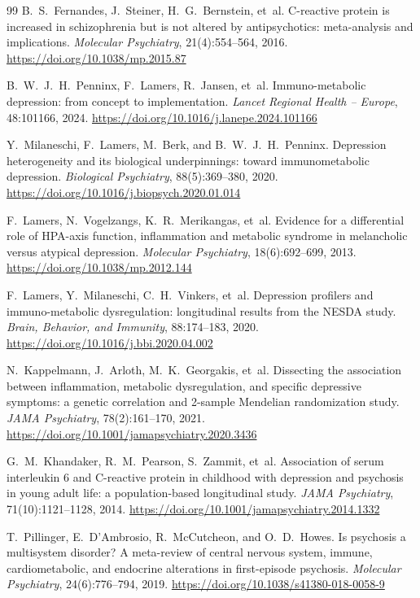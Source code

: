 \begin{thebibliography}{99}
 B.~S.~Fernandes, J.~Steiner, H.~G.~Bernstein, et~al.
\newblock C-reactive protein is increased in schizophrenia but is not altered by antipsychotics: meta-analysis
and implications. \emph{Molecular Psychiatry}, 21(4):554--564, 2016. \newblock \url{https://doi.org/10.1038/mp.2015.87}

 B.~W.~J.~H.~Penninx, F.~Lamers, R.~Jansen, et~al.
\newblock Immuno-metabolic depression: from concept to implementation. \emph{Lancet Regional Health -- Europe},
48:101166, 2024. \newblock \url{https://doi.org/10.1016/j.lanepe.2024.101166}

 Y.~Milaneschi, F.~Lamers, M.~Berk, and B.~W.~J.~H.~Penninx.
\newblock Depression heterogeneity and its biological underpinnings: toward immunometabolic depression.
\emph{Biological Psychiatry}, 88(5):369--380, 2020. \newblock \url{https://doi.org/10.1016/j.biopsych.2020.01.014}

 F.~Lamers, N.~Vogelzangs, K.~R.~Merikangas, et~al.
\newblock Evidence for a differential role of HPA-axis function, inflammation and metabolic syndrome in
melancholic versus atypical depression. \emph{Molecular Psychiatry}, 18(6):692--699, 2013.
\newblock \url{https://doi.org/10.1038/mp.2012.144}

 F.~Lamers, Y.~Milaneschi, C.~H.~Vinkers, et~al.
\newblock Depression profilers and immuno-metabolic dysregulation: longitudinal results from the NESDA study.
\emph{Brain, Behavior, and Immunity}, 88:174--183, 2020. \newblock \url{https://doi.org/10.1016/j.bbi.2020.04.002}

 N.~Kappelmann, J.~Arloth, M.~K.~Georgakis, et~al.
\newblock Dissecting the association between inflammation, metabolic dysregulation, and specific depressive
symptoms: a genetic correlation and 2-sample Mendelian randomization study. \emph{JAMA Psychiatry},
78(2):161--170, 2021. \newblock \url{https://doi.org/10.1001/jamapsychiatry.2020.3436}

 G.~M.~Khandaker, R.~M.~Pearson, S.~Zammit, et~al.
\newblock Association of serum interleukin 6 and C-reactive protein in childhood with depression and psychosis
in young adult life: a population-based longitudinal study. \emph{JAMA Psychiatry}, 71(10):1121--1128, 2014.
\newblock \url{https://doi.org/10.1001/jamapsychiatry.2014.1332}

 T.~Pillinger, E.~D'Ambrosio, R.~McCutcheon, and O.~D.~Howes.
\newblock Is psychosis a multisystem disorder? A meta-review of central nervous system, immune,
cardiometabolic, and endocrine alterations in first-episode psychosis. \emph{Molecular Psychiatry},
24(6):776--794, 2019. \newblock \url{https://doi.org/10.1038/s41380-018-0058-9}

\end{thebibliography}
\endgroup
